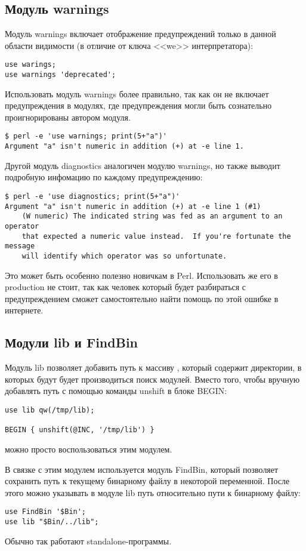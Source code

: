 \subsection{Модуль warnings} %
Модуль warnings включает отображение предупреждений только в данной области видимости (в отличие от ключа <<we>> интерпретатора):
\begin{verbatim}
use warings;
use warnings 'deprecated';
\end{verbatim}
Использовать модуль warnings более правильно, так как он не включает предупреждения в модулях, где предупреждения могли быть сознательно проигнорированы автором модуля.
\begin{verbatim}
$ perl -e 'use warnings; print(5+"a")'
Argument "a" isn't numeric in addition (+) at -e line 1.
\end{verbatim}

Другой модуль diagnostics аналогичен модулю warnings, но также выводит подробную инфомацию по каждому предупреждению:
\begin{verbatim}
$ perl -e 'use diagnostics; print(5+"a")'
Argument "a" isn't numeric in addition (+) at -e line 1 (#1)
    (W numeric) The indicated string was fed as an argument to an operator
    that expected a numeric value instead.  If you're fortunate the message
    will identify which operator was so unfortunate.
\end{verbatim}
Это может быть особенно полезно новичкам в Perl. Использовать же его в production не стоит, так как человек который будет разбираться с предупреждением сможет самостоятельно найти помощь по этой ошибке в интернете.

\subsection{Модули lib и FindBin} %
Модуль lib позволяет добавить путь к массиву \@INC, который содержит директории, в которых будут будет производиться поиск модулей. Вместо того, чтобы вручную добавлять путь с помощью команды unshift в блоке BEGIN:
\begin{verbatim}
use lib qw(/tmp/lib);

BEGIN { unshift(@INC, '/tmp/lib') }
\end{verbatim}
можно просто воспользоваться этим модулем.

В связке с этим модулем используется модуль FindBin, который позволяет сохранить путь к текущему бинарному файлу в некоторой переменной. После этого можно указывать в модуле lib путь относительно пути к бинарному файлу:
\begin{verbatim}
use FindBin '$Bin';
use lib "$Bin/../lib";
\end{verbatim}
Обычно так работают standalone-программы.

